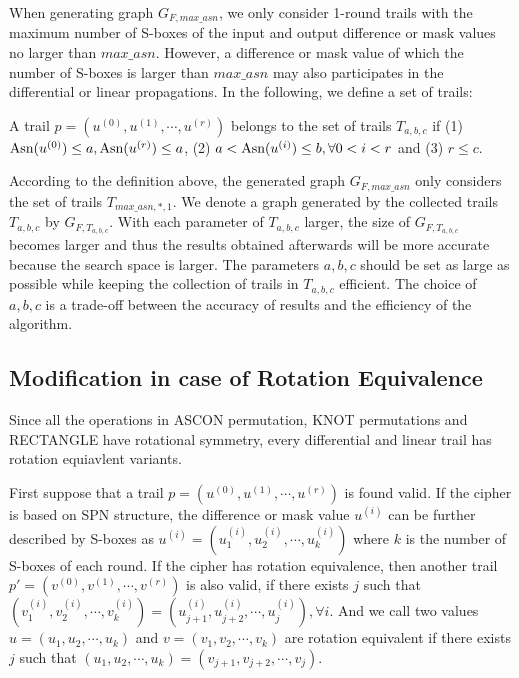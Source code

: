 When generating graph $G_{F,max\_asn}$, we only consider 1-round trails with the maximum number of S-boxes of the input and output difference or mask values no larger than $max\_asn$. However, a difference or mask value of which the number of S-boxes is larger than $max\_asn$ may also participates in the differential or linear propagations. In the following, we define a set of trails:

\begin{definition}
	A trail $p=(u^{(0)},u^{(1)},\cdots,u^{(r)})$ belongs to the set of trails $T_{a,b,c}$ if (1) $\text{Asn}(u^{(0)})\leq a,\text{Asn}(u^{(r)})\leq a$, (2) $a< \text{Asn}(u^{(i)})\leq b,\forall 0<i<r$ and (3) $r\leq c$.
\end{definition}

According to the definition above, the generated graph $G_{F,max\_asn}$ only considers the set of trails $T_{max\_asn,*,1}$. We denote a graph generated by the collected trails $T_{a,b,c}$ by $G_{F,T_{a,b,c}}$. With each parameter of $T_{a,b,c}$ larger, the size of $G_{F,T_{a,b,c}}$ becomes larger and thus the results obtained afterwards will be more accurate because the search space is larger. The parameters $a,b,c$ should be set as large as possible while keeping the collection of trails in $T_{a,b,c}$ efficient. The choice of $a,b,c$ is a trade-off between the accuracy of results and the efficiency of the algorithm.

\subsection{Modification in case of Rotation Equivalence}

Since all the operations in ASCON permutation, KNOT permutations and RECTANGLE have rotational symmetry, every differential and linear trail has rotation equiavlent variants. 

\begin{definition}
	First suppose that a trail $p=(u^{(0)},u^{(1)},\cdots,u^{(r)})$ is found valid. If the cipher is based on SPN structure, the difference or mask value $u^{(i)}$ can be further described by S-boxes as $u^{(i)}=(u_1^{(i)},u_2^{(i)},\cdots,u_k^{(i)})$ where $k$ is the number of S-boxes of each round. If the cipher has rotation equivalence, then another trail $p'=(v^{(0)},v^{(1)},\cdots,v^{(r)})$ is also valid, if there exists $j$ such that $(v_1^{(i)},v_2^{(i)},\cdots,v_k^{(i)})=(u_{j+1}^{(i)},u_{j+2}^{(i)},\cdots,u_{j}^{(i)}),\forall i$. And we call two values $u=(u_1,u_2,\cdots,u_k)$ and $v=(v_1,v_2,\cdots,v_k)$ are rotation equivalent if there exists $j$ such that $(u_1,u_2,\cdots,u_k)=(v_{j+1},v_{j+2},\cdots,v_{j})$. 
\end{definition}


